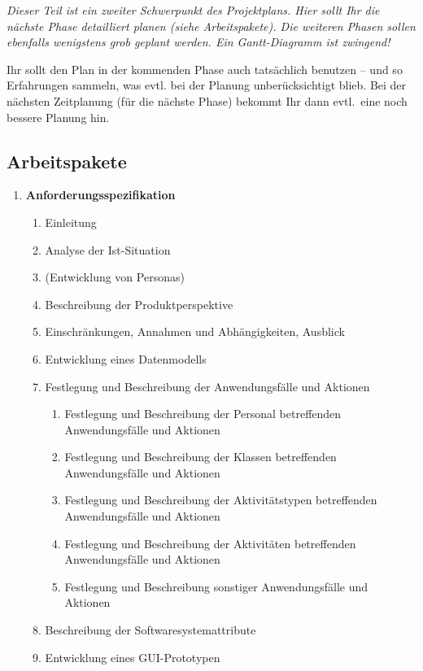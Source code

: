 \documentclass[fontsize=12pt,paper=a4,twoside]{scrartcl}
\begin{document}
{\em Dieser Teil ist ein zweiter Schwerpunkt des Projektplans. Hier sollt Ihr die nächste Phase detailliert planen (siehe Arbeitspakete). Die weiteren Phasen sollen ebenfalls wenigstens grob geplant werden. Ein Gantt-Diagramm ist zwingend! 

Ihr sollt den Plan in der kommenden Phase auch tatsächlich benutzen -- und so
  Erfahrungen sammeln, was evtl. bei der Planung unberücksichtigt
  blieb. Bei der nächsten Zeitplanung (für die nächste Phase) bekommt
  Ihr dann evtl.\ eine noch bessere Planung hin.}

\subsection{Arbeitspakete}\label{aps}


\begin{enumerate}
\item \textbf{Anforderungsspezifikation}
	\begin{enumerate}[label={(\arabic*)}]
	\item Einleitung
	\item Analyse der Ist-Situation
	\item (Entwicklung von Personas)
	\item Beschreibung der Produktperspektive
	\item Einschränkungen, Annahmen und Abhängigkeiten, Ausblick
	\item Entwicklung eines Datenmodells
	\item Festlegung und Beschreibung der Anwendungsfälle und Aktionen
		\begin{enumerate}[label={(\arabic*)}]
		\item Festlegung und Beschreibung der Personal betreffenden Anwendungsfälle und Aktionen
		\item Festlegung und Beschreibung der Klassen betreffenden Anwendungsfälle und Aktionen
		\item Festlegung und Beschreibung der Aktivitätstypen betreffenden Anwendungsfälle und Aktionen
		\item Festlegung und Beschreibung der Aktivitäten betreffenden Anwendungsfälle und Aktionen
		\item Festlegung und Beschreibung sonstiger Anwendungsfälle und Aktionen
		\end{enumerate}
	\item Beschreibung der Softwaresystemattribute	
	\item Entwicklung eines GUI-Prototypen
	\end{enumerate}	

\end{enumerate}
\end{document}
